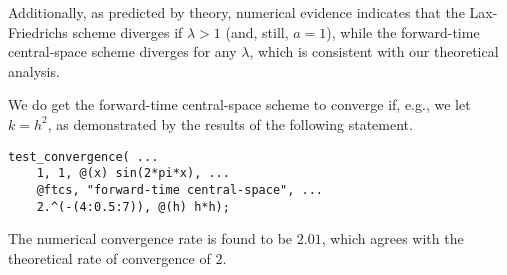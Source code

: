 \documentclass{article}
\begin{document}
\begin{itemize}
Additionally, as predicted by theory, numerical evidence indicates that the Lax-Friedrichs scheme diverges if $\lambda > 1$ (and, still, $a = 1$), while the forward-time central-space scheme diverges for any $\lambda$, which is consistent with our theoretical analysis.

We do get the forward-time central-space scheme to converge if, e.g., we let $k = h^2$, as demonstrated by the results of the following statement.

\begin{verbatim}
test_convergence( ...
    1, 1, @(x) sin(2*pi*x), ...
    @ftcs, "forward-time central-space", ...
    2.^(-(4:0.5:7)), @(h) h*h);
\end{verbatim}

The numerical convergence rate is found to be $2.01$, which agrees with the theoretical rate of convergence of $2$.

\end{itemize}
\end{document}
